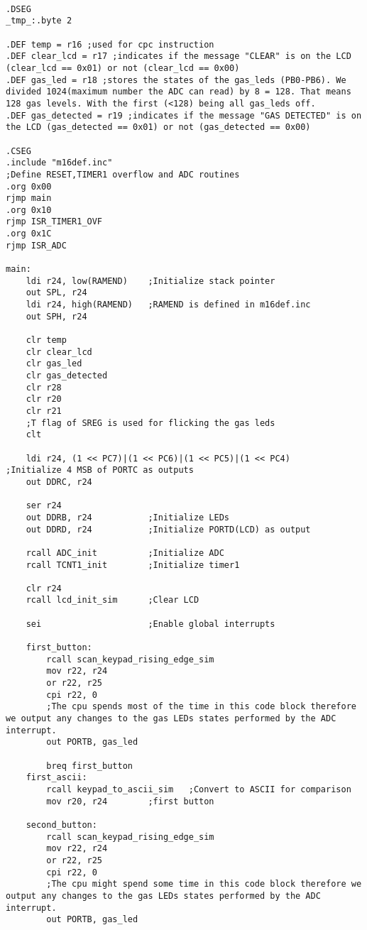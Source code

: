 \documentclass{article}
\begin{document}
\begin{verbatim}

.DSEG
_tmp_:.byte 2

.DEF temp = r16	;used for cpc instruction
.DEF clear_lcd = r17 ;indicates if the message "CLEAR" is on the LCD (clear_lcd == 0x01) or not (clear_lcd == 0x00)
.DEF gas_led = r18 ;stores the states of the gas_leds (PB0-PB6). We divided 1024(maximum number the ADC can read) by 8 = 128. That means 128 gas levels. With the first (<128) being all gas_leds off.
.DEF gas_detected = r19 ;indicates if the message "GAS DETECTED" is on the LCD (gas_detected == 0x01) or not (gas_detected == 0x00)

.CSEG
.include "m16def.inc"
;Define RESET,TIMER1 overflow and ADC routines
.org 0x00
rjmp main
.org 0x10
rjmp ISR_TIMER1_OVF
.org 0x1C
rjmp ISR_ADC

main:
	ldi r24, low(RAMEND)	;Initialize stack pointer
	out SPL, r24
	ldi r24, high(RAMEND)   ;RAMEND is defined in m16def.inc
	out SPH, r24

	clr temp
	clr clear_lcd
	clr gas_led
	clr gas_detected
	clr r28
	clr r20
	clr r21
	;T flag of SREG is used for flicking the gas leds
	clt

	ldi r24, (1 << PC7)|(1 << PC6)|(1 << PC5)|(1 << PC4)	;Initialize 4 MSB of PORTC as outputs
	out DDRC, r24

	ser r24
	out DDRB, r24			;Initialize LEDs
	out DDRD, r24			;Initialize PORTD(LCD) as output

	rcall ADC_init			;Initialize ADC
	rcall TCNT1_init		;Initialize timer1

	clr r24
	rcall lcd_init_sim		;Clear LCD

	sei						;Enable global interrupts

	first_button:
		rcall scan_keypad_rising_edge_sim
        mov r22, r24
        or r22, r25
		cpi r22, 0
		;The cpu spends most of the time in this code block therefore we output any changes to the gas LEDs states performed by the ADC interrupt.
		out PORTB, gas_led

		breq first_button
    first_ascii:
		rcall keypad_to_ascii_sim	;Convert to ASCII for comparison
		mov r20, r24		;first button

	second_button:
		rcall scan_keypad_rising_edge_sim
        mov r22, r24
        or r22, r25
        cpi r22, 0
		;The cpu might spend some time in this code block therefore we output any changes to the gas LEDs states performed by the ADC interrupt.
		out PORTB, gas_led


\end{verbatim}
\end{document}
